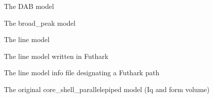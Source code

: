 \documentclass[11pt]{article}
\begin{document}
\begin{figure}
  
  \label{fig:dabmodel}
  \caption{The DAB model}
\end{figure}

\begin{figure}
  
  \label{fig:broadpeakmodel}
  \caption{The broad_peak model}
\end{figure}

\begin{figure}
  
  \label{fig:linemodel}
  \caption{The line model}
\end{figure}

\begin{figure}
  
  \label{fig:linemodel-futhark}
  \caption{The line model written in Futhark}
\end{figure}

\begin{figure}
  
  \label{fig:linemodelinfo-futhark}
  \caption{The line model info file designating a Futhark path}
\end{figure}

\begin{figure}
  
  
  \label{fig:core_shell}
  \caption{The original core\_shell\_parallelepiped model (Iq and form volume)}
\end{figure}
\end{document}
